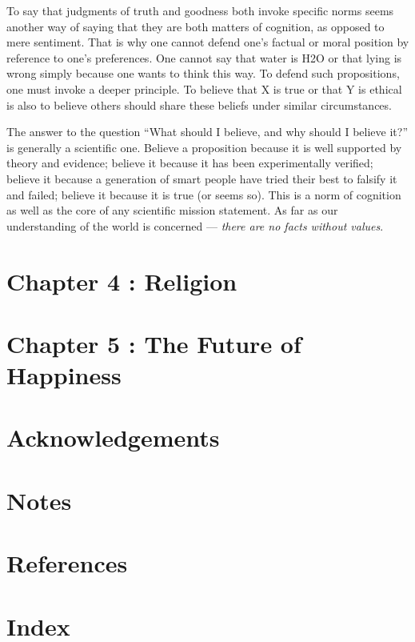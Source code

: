\documentclass[a4paper,14pt]{extbook}
\begin{document}
To say that judgments of truth and goodness both invoke specific norms seems another way of saying that they are both matters of cognition, as opposed to mere sentiment.
That is why one cannot defend one’s factual or moral position by reference to one’s preferences.
One cannot say that water is H2O or that lying is wrong simply because one wants to think this way.
To defend such propositions, one must invoke a deeper principle.
To believe that X is true or that Y is ethical is also to believe others should share these beliefs under similar circumstances.

The answer to the question ``What should I believe, and why should I believe it?'' is generally a scientific one.
Believe a proposition because it is well supported by theory and evidence;
believe it because it has been experimentally verified;
believe it because a generation of smart people have tried their best to falsify it and failed;
believe it because it is true (or seems so).
This is a norm of cognition as well as the core of any scientific mission statement.
As far as our understanding of the world is concerned --- \textit{there are no facts without values}.

\newpage
\section{Chapter 4 : Religion}

\newpage
\section{Chapter 5 : The Future of Happiness}

\newpage
\section{Acknowledgements}

\newpage
\section{Notes}

\newpage
\section{References}

\newpage
\section{Index}
\end{document}
